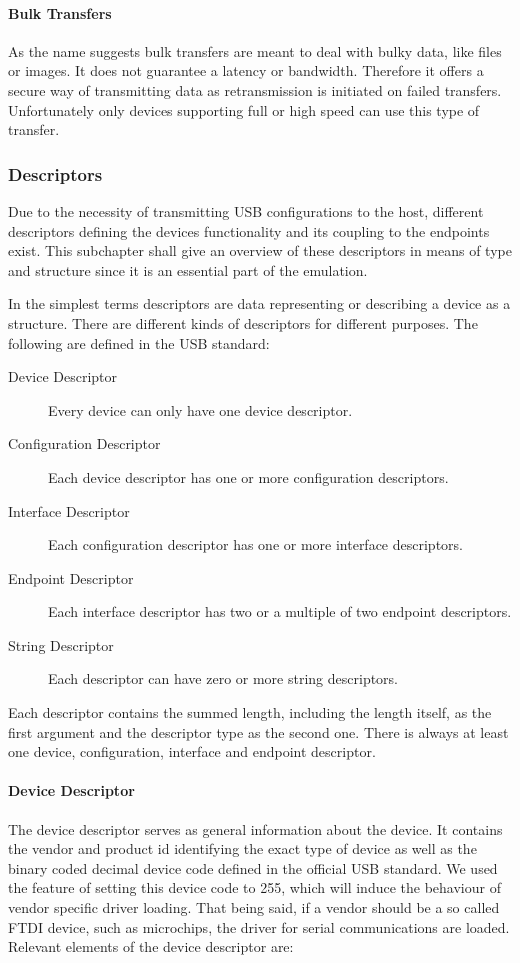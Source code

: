 \paragraph{Bulk Transfers}
As the name suggests bulk transfers are meant to deal with bulky data, like files or images. It does not guarantee a latency or 
bandwidth. Therefore it offers a secure way of transmitting data as retransmission is initiated on failed transfers. Unfortunately 
only devices supporting full or high speed can use this type of transfer. 

\subsubsection{Descriptors}
\label{sec:descriptors}
Due to the necessity of transmitting USB configurations to the host, different descriptors defining the devices functionality and its coupling to
the endpoints exist. This subchapter shall give an overview of these descriptors in means of type and structure since it is an essential part of the 
emulation. 

In the simplest terms descriptors are data representing or describing a device as a structure. There are different kinds of descriptors for different 
purposes. The following are defined in the USB standard:

\begin{description}
 \item[Device Descriptor] Every device can only have one device descriptor.
 \item[Configuration Descriptor] Each device descriptor has one or more configuration descriptors.
 \item[Interface Descriptor] Each configuration descriptor has one or more interface descriptors.
 \item[Endpoint  Descriptor] Each interface descriptor has two or a multiple of two endpoint descriptors.
 \item[String Descriptor] Each descriptor can have zero or more string descriptors.
\end{description}
Each descriptor contains the summed length, including the length itself, as the first argument and the descriptor type as the second one. There is 
always at least one device, configuration, interface and endpoint descriptor.

\paragraph{Device Descriptor}
The device descriptor serves as general information about the device. It contains the vendor and product id identifying the exact type of device as 
well as the binary coded decimal device code defined in the official USB standard. We used the feature of setting this device code to 255, which will 
induce the behaviour of vendor specific driver loading. That being said, if a vendor should be a so called FTDI device, such as microchips, the 
driver for serial communications are loaded. Relevant elements of the device descriptor are:%

